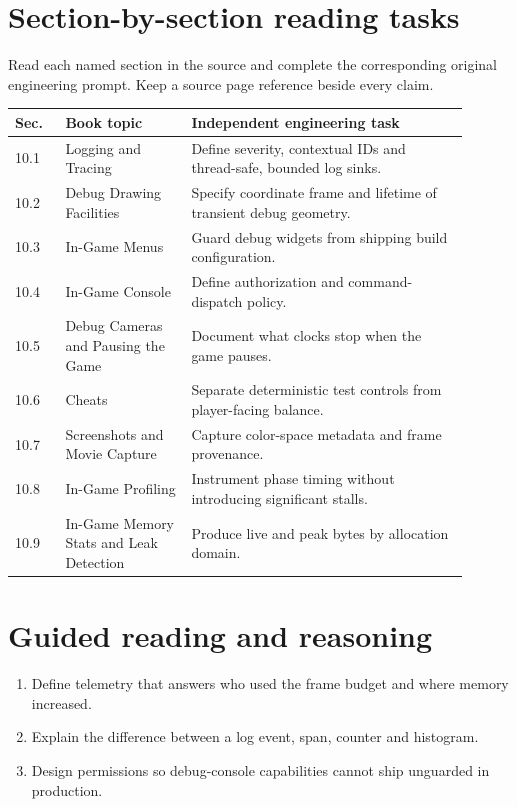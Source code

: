 \documentclass[11pt,letterpaper]{article}
\begin{document}
\section{Section-by-section reading tasks}
Read each named section in the source and complete the corresponding original engineering prompt. Keep a source page reference beside every claim.
\small\begin{longtable}{|p{0.10\linewidth}|p{0.25\linewidth}|p{0.55\linewidth}|}
\hline \textbf{Sec.} & \textbf{Book topic} & \textbf{Independent engineering task} \\ \hline\endhead
10.1 & Logging and Tracing & Define severity, contextual IDs and thread-safe, bounded log sinks. \\ \hline
10.2 & Debug Drawing Facilities & Specify coordinate frame and lifetime of transient debug geometry. \\ \hline
10.3 & In-Game Menus & Guard debug widgets from shipping build configuration. \\ \hline
10.4 & In-Game Console & Define authorization and command-dispatch policy. \\ \hline
10.5 & Debug Cameras and Pausing the Game & Document what clocks stop when the game pauses. \\ \hline
10.6 & Cheats & Separate deterministic test controls from player-facing balance. \\ \hline
10.7 & Screenshots and Movie Capture & Capture color-space metadata and frame provenance. \\ \hline
10.8 & In-Game Profiling & Instrument phase timing without introducing significant stalls. \\ \hline
10.9 & In-Game Memory Stats and Leak Detection & Produce live and peak bytes by allocation domain. \\ \hline
\end{longtable}\normalsize
\section{Guided reading and reasoning}
\begin{enumerate}
\item Define telemetry that answers who used the frame budget and where memory increased.
\item Explain the difference between a log event, span, counter and histogram.
\item Design permissions so debug-console capabilities cannot ship unguarded in production.
\end{enumerate}
\end{document}
